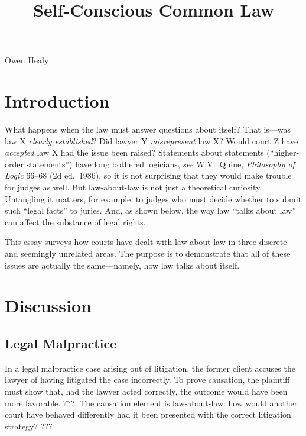 \documentclass[
  12pt,
  letterpaper,
]{scrartcl}
\title{Self-Conscious Common Law}
\author{}
\date{}
\begin{document}
\begin{center}
{\noindent Owen Healy}

\end{center}


\vspace{-5.0ex}%
\section{Introduction}

What happens when the law must answer questions about itself? That is---was law
X \emph{clearly established}? Did lawyer Y \emph{misrepresent} law X? Would
court Z have \emph{accepted} law X had the issue been raised? Statements about
statements (``higher-order statements'') have long bothered logicians,
\textit{see} W.V.~Quine, \textit{Philosophy of Logic} 66--68 (2d ed.~1986), so
it is not surprising that they would make trouble for judges as well. But
law-about-law is not just a theoretical curiosity. Untangling it matters, for
example, to judges who must decide whether to submit such ``legal facts'' to
juries. And, as shown below, the way law ``talks about law'' can affect the
substance of legal rights.

This essay surveys how courts have dealt with law-about-law in three discrete
and seemingly unrelated areas. The purpose is to demonstrate that all of these
issues are actually the same---namely, how law talks about itself.

\section{Discussion}

\subsection{Legal Malpractice}

In a legal malpractice case arising out of litigation, the former client
accuses the lawyer of having litigated the case incorrectly. To prove
causation, the plaintiff must show that, had the lawyer acted correctly, the
outcome would have been more favorable. ???. The causation element is
law-about-law: how would another court have behaved differently had it been
presented with the correct litigation strategy? ???
\end{document}
